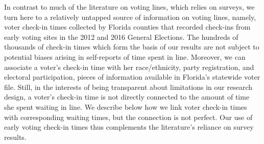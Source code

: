 \documentclass[12pt,titlepage]{article}
\begin{document}


In contrast to much of the literature on voting lines, which relies on
surveys, we turn here to a relatively untapped source of information
on voting lines, namely, voter check-in times collected by Florida
counties that recorded check-ins from early voting sites in the 2012
and 2016 General Elections.  The hundreds of thousands of check-in
times which form the basis of our results are not subject to potential
biases arising in self-reports of time spent in line.  Moreover, we
can associate a voter's check-in time with her race/ethnicity, party
registration, and electoral participation, pieces of information
available in Florida's statewide voter file.  Still, in the interests
of being transparent about limitations in our research design, a
voter's check-in time is not directly connected to the amount of time
she spent waiting in line.  We describe below how we link voter
check-in times with corresponding waiting times, but the connection is
not perfect.  Our use of early voting check-in times thus complements
the literature's reliance on survey results.
\end{document}
